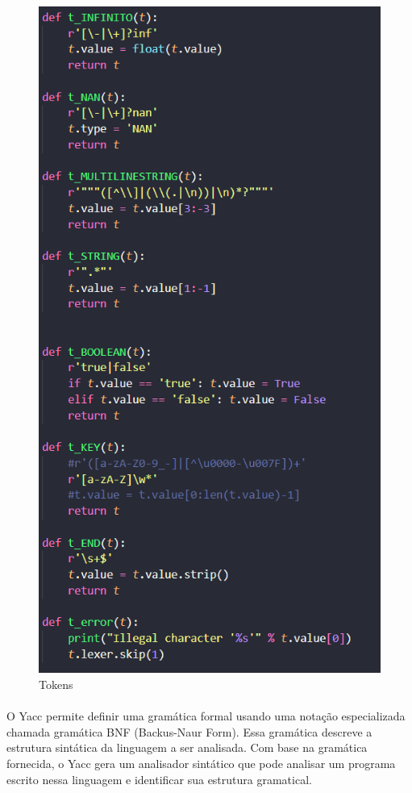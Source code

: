 \documentclass[a4paper]{report}
\begin{document}
\begin{figure}[H]
    \centering
    \includegraphics[scale=0.4]{imagens/llll.png}
    \caption{Tokens}
    \label{fig:my_label}
\end{figure}
\paragraph{}
O Yacc permite definir uma gramática formal usando uma notação especializada chamada gramática BNF (Backus-Naur Form). Essa gramática descreve a estrutura sintática da linguagem a ser analisada. Com base na gramática fornecida, o Yacc gera um analisador sintático que pode analisar um programa escrito nessa linguagem e identificar sua estrutura gramatical.
\end{document}
